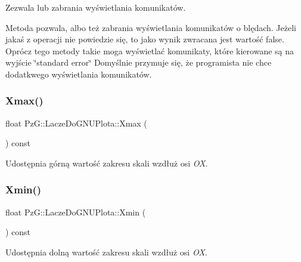 Zezwala lub zabrania wyświetlania komunikatów. 

Metoda pozwala, albo też zabrania wyświetlania komunikatów o blędach. Jeżeli jakaś z operacji nie powiedzie się, to jako wynik zwracana jest wartość {\ttfamily false}. Oprócz tego metody takie moga wyświetlać komunikaty, które kierowane są na wyjście \char`\"{}standard error\char`\"{} Domyślnie przymuje się, że programista nie chce dodatkwego wyświetlania komunikatów. \mbox{\label{classPzG_1_1LaczeDoGNUPlota_a8e23479629af3df3d352b7839ae396b8}} 
\subsubsection{\texorpdfstring{Xmax()}{Xmax()}}
{\footnotesize\ttfamily float Pz\+G\+::\+Lacze\+Do\+G\+N\+U\+Plota\+::\+Xmax (\begin{DoxyParamCaption}{ }\end{DoxyParamCaption}) const\hspace{0.3cm}{\ttfamily [inline]}}

Udostępnia górną wartość zakresu skali wzdłuż osi {\itshape OX}. \mbox{\label{classPzG_1_1LaczeDoGNUPlota_a66836c9749bf179420e4ca3e9447efd7}} 
\subsubsection{\texorpdfstring{Xmin()}{Xmin()}}
{\footnotesize\ttfamily float Pz\+G\+::\+Lacze\+Do\+G\+N\+U\+Plota\+::\+Xmin (\begin{DoxyParamCaption}{ }\end{DoxyParamCaption}) const\hspace{0.3cm}{\ttfamily [inline]}}

Udostępnia dolną wartość zakresu skali wzdłuż osi {\itshape OX}. \mbox{\label{classPzG_1_1LaczeDoGNUPlota_ac54e4e7448ce3bd324efdc94a999f535}} 
